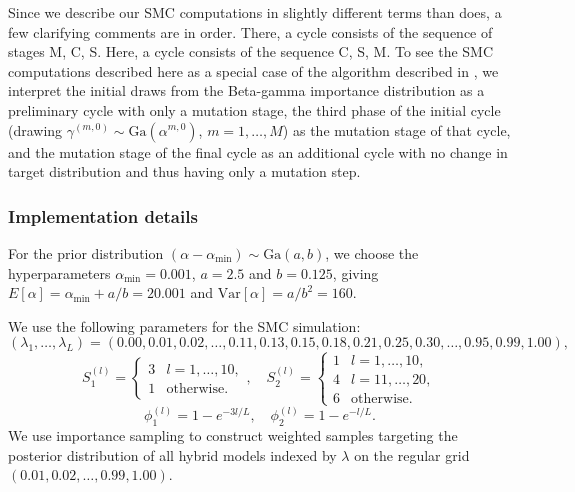 \documentclass[11pt,letter]{article}
\begin{document}
Since we describe our SMC computations in slightly different terms than  does, a few clarifying comments are in order.
There, a cycle consists of the sequence of stages M, C, S.
Here, a cycle consists of the sequence C, S, M.
To see the SMC computations described here as a special case of the algorithm described in , we interpret the initial draws from the Beta-gamma importance distribution as a preliminary cycle with only a mutation stage, the third phase of the initial cycle (drawing $\gamma^{(m,0)} \sim \mathrm{Ga}(\alpha^{m,0})$, $m=1,\ldots,M$) as the mutation stage of that cycle, and the mutation stage of the final cycle as an additional cycle with no change in target distribution and thus having only a mutation step.

\subsubsection{Implementation details}

For the prior distribution $(\alpha - \alpha_\mathrm{min}) \sim \mathrm{Ga}(a,b)$, we choose the hyperparameters $\alpha_\mathrm{min} = 0.001$, $a=2.5$ and $b=0.125$, giving $E[\alpha] = \alpha_\mathrm{min} + a/b = 20.001$ and $\mathrm{Var}[\alpha] = a/b^2 = 160$.

We use the following parameters for the SMC simulation:
\[
  (\lambda_1, \ldots, \lambda_L) = (0.00, 0.01, 0.02, \ldots, 0.11, 0.13, 0.15, 0.18, 0.21, 0.25, 0.30, \ldots, 0.95, 0.99, 1.00),
\]
\[
  S_1^{(l)} = \begin{cases} 3 & l = 1,\ldots,10,\\ 1 & \mbox{otherwise}. \end{cases},
  \quad
  S_2^{(l)} = \begin{cases} 1 & l = 1,\ldots,10,\\ 4 & l = 11,\ldots,20,\\ 6 & \mbox{otherwise}. \end{cases}
\]
\[
  \phi_1^{(l)} = 1 - e^{-3l/L}, \quad \phi_2^{(l)} = 1 - e^{-l/L}.
\]
We use importance sampling to construct weighted samples targeting the posterior distribution of all hybrid models indexed by $\lambda$ on the regular grid $(0.01,0.02,\ldots,0.99,1.00)$.
\end{document}
